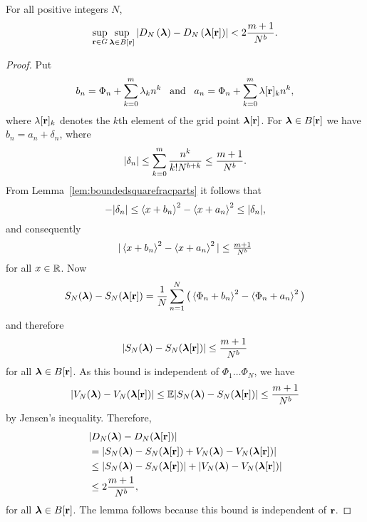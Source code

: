 \documentclass[journal]{IEEEtran}
\begin{document}
 \begin{lemma}\label{lem:supBVn} 
For all positive integers $N$,
\[
\sup_{\mathbf{r}\in G}\sup_{ \boldsymbol{\lambda}  \in B[\mathbf{r}] }\left\vert D_N\left(  \boldsymbol{\lambda} \right) - D_N\left(  \boldsymbol{\lambda}[\mathbf{r}] \right)\right\vert < 2\frac{m+1}{N^b}.
\]
 \end{lemma}
 \begin{proof}
Put 
\[
b_n = \Phi_n + \sum_{k = 0}^{m}{\lambda_k n^k} \;\;\; \text{and}  \;\;\; a_n = \Phi_n + \sum_{k = 0}^{m}{\lambda[\mathbf{r}]_k n^k},
\]
where $\lambda[\mathbf{r}]_k$ denotes the $k$th element of the grid point $\boldsymbol{\lambda}[\mathbf{r}]$. For $\boldsymbol{\lambda} \in B[\mathbf{r}]$ we have $b_n = a_n + \delta_n$,
where 
\[
\vert \delta_n \vert \leq \sum_{k=0}^m\frac{n^k}{k! N^{b+k}} \leq \frac{m+1}{N^{b}}.
\]
From Lemma~\ref{lem:boundedsquarefracparts} it follows that 
\[
-|\delta_n| \leq \left\langle x + b_n \right\rangle^2 -  \left\langle x + a_n \right\rangle^2  \leq |\delta_n|,
\]
and consequently 
\[
|\left\langle x + b_n \right\rangle^2 -  \left\langle x + a_n \right\rangle^2| \leq \tfrac{m+1}{N^b}
\] 
for all $x \in {\mathbb R}$. Now
\[
S_N(\boldsymbol{\lambda}) - S_N(\boldsymbol{\lambda}[\mathbf{r}]) =  \frac{1}{N}\sum_{n=1}^{N}\big( \left\langle \Phi_n + b_n \right\rangle^2 -  \left\langle \Phi_n + a_n \right\rangle^2 \big)
\]
and therefore 
\[
\vert S_N(\boldsymbol{\lambda}) - S_N(\boldsymbol{\lambda}[\mathbf{r}]) \vert \leq \frac{m+1}{N^b}
\] 
for all $\boldsymbol{\lambda} \in B[\mathbf{r}]$.  As this bound is independent of $\Phi_1 \dots \Phi_N$, we have
\[
\vert  V_N(\boldsymbol{\lambda}) - V_N(\boldsymbol{\lambda}[\mathbf{r}]) \vert \leq {\mathbb E} \vert  S_N(\boldsymbol{\lambda}) - S_N(\boldsymbol{\lambda}[\mathbf{r}]) \vert \leq \frac{m+1}{N^b}
\]
by Jensen's inequality.  Therefore,
 \begin{align*}
 &\vert  D_N(\boldsymbol{\lambda}) - D_N(\boldsymbol{\lambda}[\mathbf{r}])  \vert \\
&= \vert  S_N(\boldsymbol{\lambda}) - S_N(\boldsymbol{\lambda}[\mathbf{r}]) + V_N(\boldsymbol{\lambda}) - V_N(\boldsymbol{\lambda}[\mathbf{r}])  \vert \\
&\leq \vert  S_N(\boldsymbol{\lambda}) - S_N(\boldsymbol{\lambda}[\mathbf{r}]) \vert + \vert V_N(\boldsymbol{\lambda}) - V_N(\boldsymbol{\lambda}[\mathbf{r}])  \vert \\
&\leq 2\frac{m+1}{N^{b}},
\end{align*}
for all $\boldsymbol{\lambda} \in B[\mathbf{r}]$.  The lemma follows because this bound is independent of $\mathbf{r}$.
 \end{proof}



 
\end{document}
